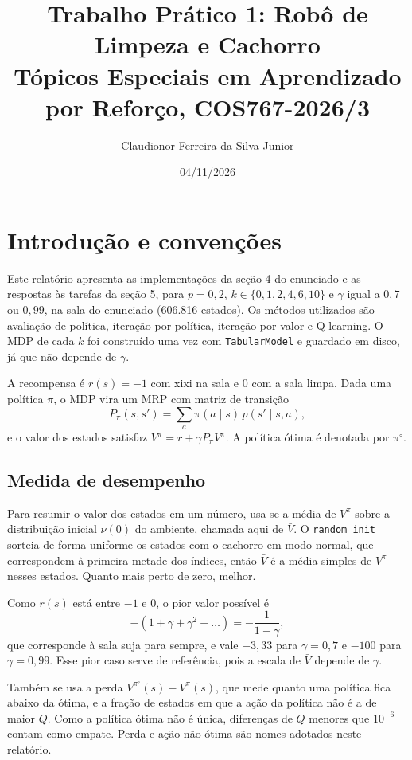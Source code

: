 \documentclass[11pt,a4paper]{article}
\title{Trabalho Prático 1: Robô de Limpeza e Cachorro\\[4pt]
\large Tópicos Especiais em Aprendizado por Reforço, COS767-2026/3}
\author{Claudionor Ferreira da Silva Junior}
\date{04/11/2026}
\newcommand{\Vbar}{\bar{V}}
\newcommand{\code}[1]{\texttt{#1}}
\begin{document}
\maketitle

\section{Introdução e convenções}

Este relatório apresenta as implementações da seção 4 do enunciado e as respostas às tarefas da seção 5, para $p = 0{,}2$, $k \in \{0, 1, 2, 4, 6, 10\}$ e $\gamma$ igual a $0{,}7$ ou $0{,}99$, na sala do enunciado (606.816 estados). Os métodos utilizados são avaliação de política, iteração por política, iteração por valor e Q-learning. O MDP de cada $k$ foi construído uma vez com \code{TabularModel} e guardado em disco, já que não depende de $\gamma$.

A recompensa é $r(s) = -1$ com xixi na sala e $0$ com a sala limpa. Dada uma política $\pi$, o MDP vira um MRP com matriz de transição
\[
P_\pi(s, s') = \sum_a \pi(a \mid s)\, p(s' \mid s, a),
\]
e o valor dos estados satisfaz $V^\pi = r + \gamma P_\pi V^\pi$. A política ótima é denotada por $\pi^\circ$.

\subsection*{Medida de desempenho}

Para resumir o valor dos estados em um número, usa-se a média de $V^\pi$ sobre a distribuição inicial $\nu(0)$ do ambiente, chamada aqui de $\Vbar$. O \code{random\_init} sorteia de forma uniforme os estados com o cachorro em modo normal, que correspondem à primeira metade dos índices, então $\Vbar$ é a média simples de $V^\pi$ nesses estados. Quanto mais perto de zero, melhor.

Como $r(s)$ está entre $-1$ e $0$, o pior valor possível é
\[
-(1 + \gamma + \gamma^2 + \dots) = -\frac{1}{1-\gamma},
\]
que corresponde à sala suja para sempre, e vale $-3{,}33$ para $\gamma = 0{,}7$ e $-100$ para $\gamma = 0{,}99$. Esse pior caso serve de referência, pois a escala de $\Vbar$ depende de $\gamma$.

Também se usa a perda $V^{\pi^\circ}(s) - V^\pi(s)$, que mede quanto uma política fica abaixo da ótima, e a fração de estados em que a ação da política não é a de maior $Q$. Como a política ótima não é única, diferenças de $Q$ menores que $10^{-6}$ contam como empate. Perda e ação não ótima são nomes adotados neste relatório.
\end{document}
